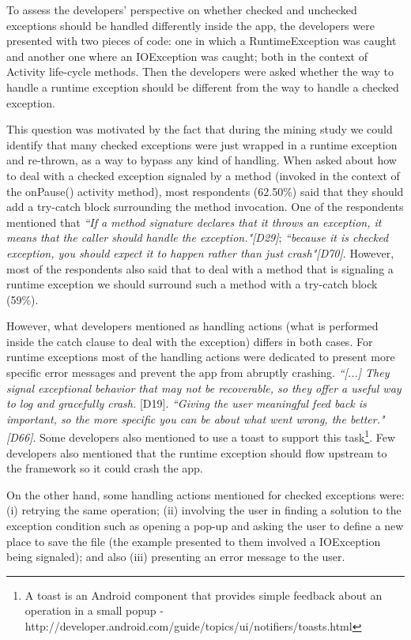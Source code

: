 To assess the developers' perspective on whether checked and unchecked exceptions should be handled differently inside the app, the developers were presented with two pieces of code: one in which a RuntimeException was caught and another one where an IOException was caught; both in the context of Activity life-cycle methods. Then the developers were asked whether the way to handle a runtime exception should be different from the way to handle a checked exception. 

This question was motivated by the fact that during the mining study we could identify that many checked exceptions were just wrapped in a runtime exception and re-thrown, as a way to bypass any kind of handling. When asked about how to deal with a checked exception signaled by a method (invoked in the context of the onPause() activity method), most respondents (62.50\%) said that they should add a try-catch block surrounding the method invocation. One of the respondents mentioned that \emph{``If a method signature declares that it throws an exception, it means that the caller should handle the exception."[D29]}; \emph{``because it is checked exception, you should expect it to happen rather than just crash"[D70]}. However, most of the respondents also said that to deal with a method that is signaling a runtime exception we should surround such a method with a try-catch block (59\%). 

However, what developers mentioned as handling actions (what is performed inside the catch clause to deal with the exception) differs in both cases. For runtime exceptions most of the handling actions were dedicated to present more specific error messages and prevent the app from abruptly crashing. \emph{``[...] They signal exceptional behavior that may not be recoverable, so they offer a useful way to log and gracefully crash.} [D19]. \emph{``Giving the user meaningful feed back is important, so the more specific you can be about what went wrong, the better."[D66]}. Some developers also mentioned to use a toast to support this task\footnote{A toast is an Android component that provides simple feedback about an operation in a small popup - http://developer.android.com/guide/topics/ui/notifiers/toasts.html}. Few developers also mentioned that the runtime exception should flow upstream to the framework so it could crash the app.

On the other hand, some handling actions mentioned for checked exceptions were: (i) retrying the same operation; (ii) involving the user in finding a solution to the exception condition such as opening a pop-up and asking the user to define a new place to save the file (the example presented to them involved a IOException being signaled); and also (iii) presenting an error message to the user. 

